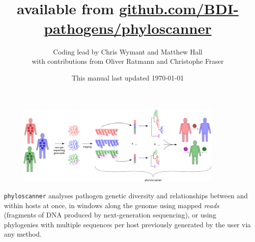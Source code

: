 \documentclass{article}
\title{\p\\available from \href{https://github.com/BDI-pathogens/phyloscanner}{github.com/BDI-pathogens/phyloscanner}}
\date{This manual last updated \today}
\author{Coding lead by Chris Wymant and Matthew Hall\\with contributions from Oliver Ratmann and Christophe Fraser}
\newcommand{\p}{\texttt{phyloscanner}\xspace}
\begin{document}
\maketitle


\begin{figure}[!h]
\centering
\includegraphics[width=0.9\textwidth]{InfoAndInputs/PhyloscannerDiagram_big4.pdf}
\end{figure}

\p analyses pathogen genetic diversity and relationships between and within hosts at once, in windows along the genome using mapped {\it reads} (fragments of DNA produced by next-generation sequencing), or using phylogenies with multiple sequences per host previously generated by the user via any method.



\end{document}
